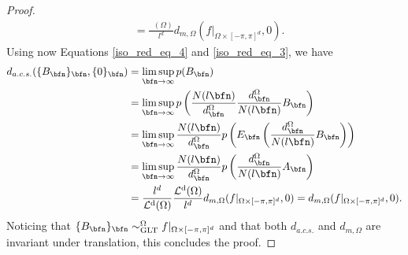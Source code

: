 \documentclass{amsart}
\DeclareMathOperator{\Ld}{\mathcal{L}^d}
\begin{document}
\begin{proof}
\begin{align}
        \nonumber&=\frac{\Ld(\Omega)}{l^d}d_{m,\Omega}(f|_{\Omega\times[-\pi,\pi]^d},0).
    \end{align}
    Using now Equations \eqref{iso_red_eq_4} and \eqref{iso_red_eq_3}, we have
    \begin{align*}
    d_{a.c.s.}(\{B_\bfn\}_\bfn,\{0\}_\bfn)&=\limsup\limits_{\bfn\to\infty}p(B_\bfn)\\
          &=\limsup\limits_{\bfn\to\infty}p\left(\frac{N(l\bfn)}{d_\bfn^\Omega}\frac{d_\bfn^\Omega}{N(l\bfn)}B_\bfn\right)\\
          &=\limsup\limits_{\bfn\to\infty}\frac{N(l\bfn)}{d_\bfn^\Omega}p\left(E_\bfn\left(\frac{d_\bfn^\Omega}{N(l\bfn)}B_\bfn\right)\right)\\
          &=\limsup\limits_{\bfn\to\infty}\frac{N(l\bfn)}{d_\bfn^\Omega}p\left(\frac{d_\bfn^\Omega}{N(l\bfn)}A_\bfn\right)\\
          &=\frac{l^d}{\Ld(\Omega)}\frac{\Ld(\Omega)}{l^d}d_{m,\Omega}(f|_{\Omega\times[-\pi,\pi]^d},0)=d_{m,\Omega}(f|_{\Omega\times[-\pi,\pi]^d},0).
    \end{align*}
    Noticing that $\{B_\bfn\}_\bfn\sim^\Omega_{\mathrm{GLT}}f|_{\Omega\times[-\pi,\pi]^d}$ and that both $d_{a.c.s.}$ and $d_{m,\Omega}$ are invariant under translation, this concludes the proof. 
\end{proof}
\end{document}
